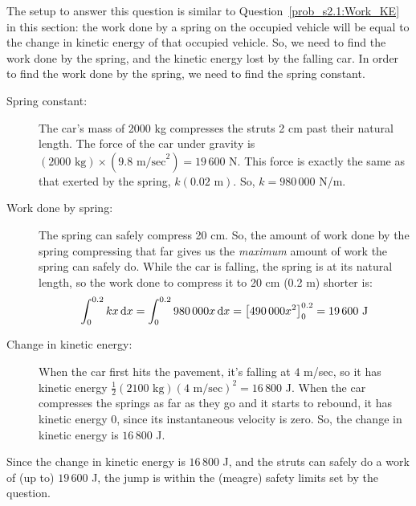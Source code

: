 \begin{solution}
The setup to answer this question is similar to Question~\ref{prob_s2.1:Work_KE} in this section: the work done by a spring on the occupied vehicle will be equal to the change in kinetic energy of that occupied vehicle. So, we need to find the work done by the spring, and the kinetic energy lost by the falling car. In order to find the work done by the spring, we need to find the spring constant.

\begin{description}
\item[Spring constant:] The car's mass of 2000 kg compresses the struts 2 cm past their natural length. The force of the car under gravity is $(2000 \text{ kg})\times(9.8 \text{ m/sec}^2) = 19\,600 $ N. This force is exactly the same as that exerted by the   spring, $k(0.02 \text{ m})$. So, $k = 980\,000$ N/m.
\item[Work done by spring:] The spring can safely compress 20 cm. So, the amount of work done by the spring compressing that far gives us the \emph{maximum} amount of work the spring can safely do. While the car is falling, the spring is at its natural length, so the work done to compress it to 20 cm (0.2 m) shorter is:
\[\int_0^{0.2} kx\,\mathrm{d}x = \int_0^{0.2} 980\,000 x\,\mathrm{d}x =\big[490\,000 x^2 \big]_0^{0.2}=19\,600 \text{ J}\]
\item[Change in kinetic energy:]
When the car first hits the pavement, it's falling at $4$ m/sec, so it has kinetic energy $\frac{1}{2}(2100\text{ kg})(4\text{ m/sec})^2 = 16\,800$ J. When the car compresses the springs as far as they go and it starts to rebound, it has kinetic energy 0, since its instantaneous velocity is zero. So, the change in kinetic energy is
$16\,800$ J.
\end{description}
Since the change in kinetic energy is $16\,800$ J, and the struts can safely do a work of (up to) $19\,600$ J, the jump is within the (meagre) safety limits set by the question.
\end{solution}




\subsection*{\Application}



